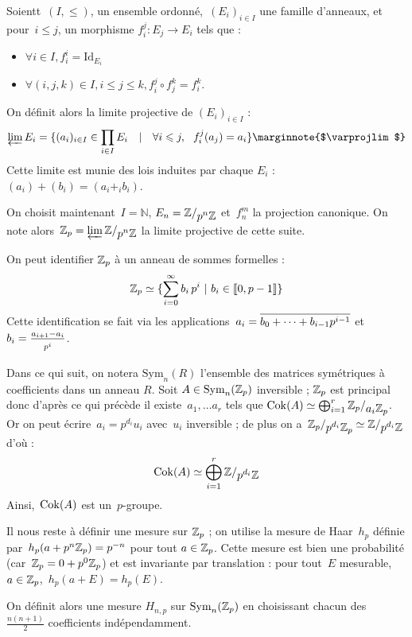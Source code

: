 \begin{defi}
Soientt~$(I, \leq)$, un ensemble ordonné,~$(E_i)_{i\in I}$ une famille d'anneaux, et pour~$i\leq j$, un morphisme $f_i^j : E_j \to E_i$ tels que :
\begin{itemize}
\item $\forall i\in I, f_i^i = \text{Id}_{E_i}$
\item $\forall (i,j,k)\in I, i\leq j\leq k, f_i^j \circ f_j^k = f_i^k$.
\end{itemize}
On définit alors la limite projective de $(E_i)_{i\in I}$ :
\[ \varprojlim{E_i} = \{(a_i)_{i\in I}\in \prod_{i\in I}{E_i}\quad |\quad\forall i\leq j,\ \  f_i^j(a_j) = a_i \} \text{\marginnote{$\varprojlim$}} \]
Cette limite est munie des lois induites par chaque $E_i$ : $(a_i) + (b_i) = (a_i +_i b_i)$.
\end{defi}

On choisit maintenant~$I = \mathbb N$, $E_n = \quotient{\mathbb{Z}}{p^n \mathbb Z}$ et~$f_n^m$ la projection canonique. On note alors~$\Zp = \varprojlim{\quotient{\mathbb Z}{p^n\mathbb Z}}$ la limite projective de cette suite. \marginnote{$\Zp$}

\begin{rem}
On peut identifier $\Zp$ à un anneau de sommes formelles :
\[ \mathbb{Z}_p \simeq \{ \sum_{i=0}^\infty{b_i\,p^i}\   |\  b_i\in\llbracket0, p-1 \rrbracket\} \]
Cette identification se fait via les applications~$a_i = \overline{\strut b_0+\dots+b_{i-1}p^{i-1}}$ et~$b_i = \frac{a_{i+1}-a_i}{\strut p^i}$.
\end{rem}

Dans ce qui suit, on notera $\text{Sym}_n(R)$ l'ensemble des matrices symétriques à coefficients dans un anneau $R$.
Soit $A \in \operatorname{Sym}_n(\mathbb{Z}_p)$ inversible ; $\Zp$ est principal donc d'après ce qui précède il existe~$a_1, \dots a_r$ tels que $\Cok(A) \simeq \bigoplus_{i=1}^r{\quotient{\Zp}{a_i\Zp}}$.
Or on peut écrire~$a_i = p^{d_i}u_i$ avec~$u_i$ inversible ; de plus on a~$\quotient{\Zp}{p^{d_i}\Zp} \simeq \quotient{\mathbb Z}{p^{d_i}\mathbb Z}$ d'où :
\[ \Cok(A) \simeq \bigoplus_{i=1}^r \quotient{\mathbb Z}{p^{d_i}\mathbb Z} \]
Ainsi,~$\operatorname{Cok}(A)$ est un~$p$-groupe.

Il nous reste à définir une mesure sur $\Zp$ ; on utilise la mesure de Haar~$h_p$ définie par~$h_p(a+p^n\mathbb{Z}_p) = p^{-n}$ pour tout $a\in\mathbb{Z}_p$.
Cette mesure est bien une probabilité (car~$\mathbb{Z}_p = 0+p^0\mathbb{Z}_p$) et est invariante par translation : pour tout~$E$ mesurable,~$a\in\mathbb{Z}_p$,~$h_p(a+E)=h_p(E)$.

On définit alors une mesure $H_{n,p}$ sur $\operatorname{Sym}_n(\mathbb{Z}_p)$ en choisissant chacun des $\frac{n(n+1)}2$ coefficients indépendamment.